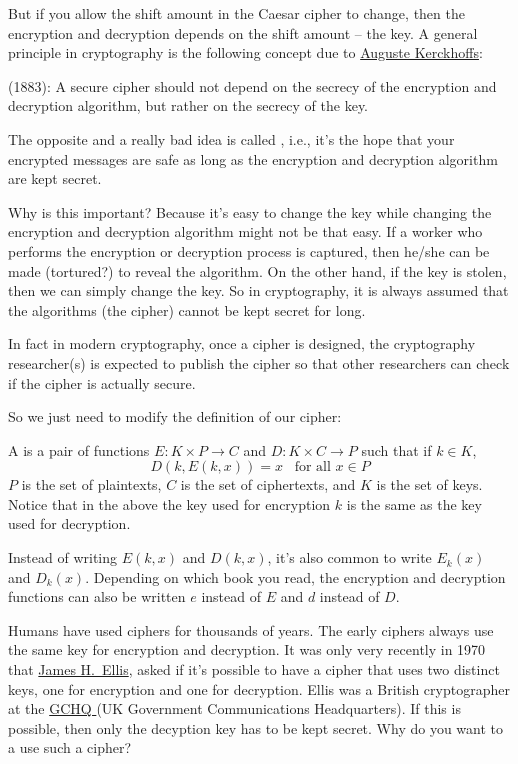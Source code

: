 But if you allow the shift amount in the Caesar cipher to change,
then the encryption and decryption depends on the shift amount -- the key.
A general principle in cryptography is the following
concept due to
\href{https://en.wikipedia.org/wiki/Auguste_Kerckhoffs}{Auguste Kerckhoffs}:

 (1883):
A secure cipher should not depend on the secrecy of the encryption
and decryption algorithm, but rather on the secrecy of the key.


The opposite and a really bad idea is called 
,
i.e., it's the hope that your
encrypted messages are safe as long as the encryption and decryption
algorithm are kept secret.

Why is this important?
Because it's easy to change the key while changing the encryption
and decryption algorithm might not be that easy.
If a worker who performs the encryption or decryption process is captured,
then he/she can be made (tortured?) to reveal the algorithm.
On the other hand, if the key is stolen, then we can simply change the key.
So in cryptography, it is always assumed that the algorithms (the cipher)
cannot be kept secret for long.

In fact in modern cryptography, once a cipher is designed,
the cryptography researcher(s) is expected to publish the cipher
so that other researchers can check if the cipher is actually secure.

So we just need to modify the definition of our cipher:

\begin{defn}
A
is
a pair of functions
$E: K \times P \rightarrow C$ and
$D: K \times C \rightarrow P$ such that
if $k \in K$,
\[
D(k, E(k, x)) = x \,\,\, \text{ for all } x \in P
\]
$P$ is the set of plaintexts, $C$ is the set of ciphertexts,
and $K$ is the set of keys.
Notice that in the above the key used for encryption $k$
is the same as the key used for decryption.
\end{defn}

Instead of writing $E(k, x)$ and $D(k, x)$,
it's also common to write $E_{k}(x)$ and $D_{k}(x)$.
Depending on which book you read, the encryption and decryption functions
can also be written $e$ instead of $E$ and $d$ instead of $D$.

Humans have used ciphers for thousands of years.
The early ciphers always use the same key for encryption and decryption.
It was only very recently in 1970 that
\href{https://en.wikipedia.org/wiki/James_H._Ellis}{James H.~Ellis},
asked if it's possible to have a cipher that uses two distinct keys,
one for encryption and one for decryption.
Ellis was a British cryptographer at the
\href{https://en.wikipedia.org/wiki/GCHQ}{GCHQ }
(UK Government Communications
Headquarters).
If this is possible, then only the decyption key has to be kept secret.
Why do you want to a use such a cipher?

